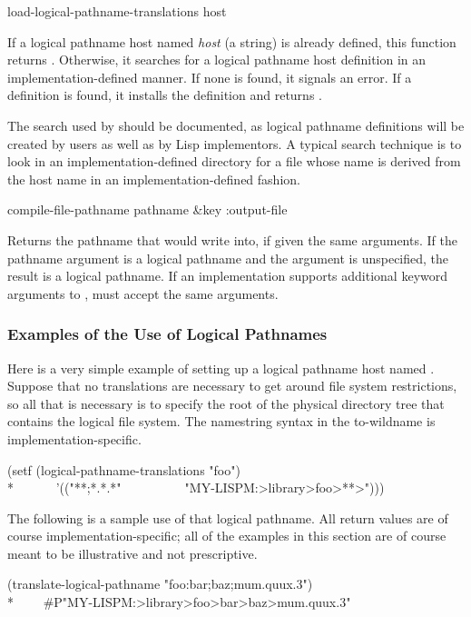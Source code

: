 \begin{defun}[Function]
load-logical-pathname-translations host

    If a logical pathname host named \emph{host} (a string) is already defined,
    this function returns .  Otherwise, it searches for a logical pathname host definition
    in an implementation-defined manner.  If none is found, it signals an
    error.  If a definition is found, it installs the definition and returns .

    The search used by  should be
    documented, as logical pathname definitions will be created by users as well as
    by Lisp implementors.  A typical search technique is to
    look in an implementation-defined directory for a file whose name is derived from
    the host name in an implementation-defined fashion.
\end{defun}

\begin{defun}[Function]
compile-file-pathname pathname &key :output-file           

    Returns the pathname that  would write into, if given the
    same arguments.  If the pathname argument is a logical pathname and the
     argument is unspecified, the result is a logical pathname.
    If an implementation supports additional keyword arguments to
    ,  must accept the same arguments.
\end{defun}

\subsubsection{Examples of the Use of Logical Pathnames}

  Here is a very simple example of setting up a logical pathname host named .
  Suppose that no
  translations are necessary to get around file system restrictions, so
  all that is necessary is to specify the root of the physical directory
  tree that contains the logical file system.
 The namestring syntax in the to-wildname is implementation-specific.
\begin{lisp}
(setf (logical-pathname-translations "foo") \\*
~~~~~~'(("**;*.*.*"~~~~~~~~~~"MY-LISPM:>library>foo>**>")))
\end{lisp}
The following is a sample use of that logical pathname.  All return values
are of course implementation-specific; all of the examples in this section
are of course meant to be illustrative and not prescriptive.
\begin{lisp}
(translate-logical-pathname "foo:bar;baz;mum.quux.3") \\*
~~~\EV\ \#P"MY-LISPM:>library>foo>bar>baz>mum.quux.3"
\end{lisp}

